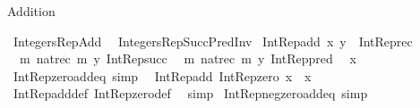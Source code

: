 %
\begin{isabellebody}%
%
%
\begin{isamarkuptext}%
Addition%
\end{isamarkuptext}\isamarkuptrue%
%
\isadelimtheory
%
\endisadelimtheory
%
\isatagtheory
{}\isamarkupfalse%
\ Integers{\isacharunderscore}{\kern0pt}Rep{\isacharunderscore}{\kern0pt}Add\isanewline
{}\isanewline
\ \ Integers{\isacharunderscore}{\kern0pt}Rep{\isacharunderscore}{\kern0pt}Succ{\isacharunderscore}{\kern0pt}Pred{\isacharunderscore}{\kern0pt}Inv\isanewline
{}%
\endisatagtheory
{\isafoldtheory}%
%
\isadelimtheory
%
\endisadelimtheory
\isanewline
\isanewline
{}\isamarkupfalse%
\ {\isachardoublequoteopen}Int{\isacharunderscore}{\kern0pt}Rep{\isacharunderscore}{\kern0pt}add\ x\ y\ {\isasymequiv}\ Int{\isacharunderscore}{\kern0pt}Rep{\isacharunderscore}{\kern0pt}rec\isanewline
\ \ {\isacharparenleft}{\kern0pt}{\isasymlambda}m{\isachardot}{\kern0pt}\ nat{\isacharunderscore}{\kern0pt}rec\ m\ y\ Int{\isacharunderscore}{\kern0pt}Rep{\isacharunderscore}{\kern0pt}succ{\isacharparenright}{\kern0pt}\isanewline
\ \ {\isacharparenleft}{\kern0pt}{\isasymlambda}m{\isachardot}{\kern0pt}\ nat{\isacharunderscore}{\kern0pt}rec\ m\ y\ Int{\isacharunderscore}{\kern0pt}Rep{\isacharunderscore}{\kern0pt}pred{\isacharparenright}{\kern0pt}\isanewline
\ \ x{\isachardoublequoteclose}\isanewline
\isanewline
\isanewline
\isanewline
\isanewline
{}\isamarkupfalse%
\ Int{\isacharunderscore}{\kern0pt}Rep{\isacharunderscore}{\kern0pt}zero{\isacharunderscore}{\kern0pt}add{\isacharunderscore}{\kern0pt}eq\ {\isacharbrackleft}{\kern0pt}simp{\isacharbrackright}{\kern0pt}{\isacharcolon}{\kern0pt}\isanewline
\ \ {\isachardoublequoteopen}Int{\isacharunderscore}{\kern0pt}Rep{\isacharunderscore}{\kern0pt}add\ Int{\isacharunderscore}{\kern0pt}Rep{\isacharunderscore}{\kern0pt}zero\ x\ {\isacharequal}{\kern0pt}\ x{\isachardoublequoteclose}\isanewline
%
\isadelimproof
\ \ %
\endisadelimproof
%
\isatagproof
{}\isamarkupfalse%
\ Int{\isacharunderscore}{\kern0pt}Rep{\isacharunderscore}{\kern0pt}add{\isacharunderscore}{\kern0pt}def\ Int{\isacharunderscore}{\kern0pt}Rep{\isacharunderscore}{\kern0pt}zero{\isacharunderscore}{\kern0pt}def\ \isamarkupfalse%
\ simp%
\endisatagproof
{\isafoldproof}%
%
\isadelimproof
\isanewline
%
\endisadelimproof
\isanewline
\isanewline
{}\isamarkupfalse%
\ Int{\isacharunderscore}{\kern0pt}Rep{\isacharunderscore}{\kern0pt}neg{\isacharunderscore}{\kern0pt}zero{\isacharunderscore}{\kern0pt}add{\isacharunderscore}{\kern0pt}eq\ {\isacharbrackleft}{\kern0pt}simp{\isacharbrackright}{\kern0pt}{\isacharcolon}{\kern0pt}\isanewline

\end{isabellebody}
